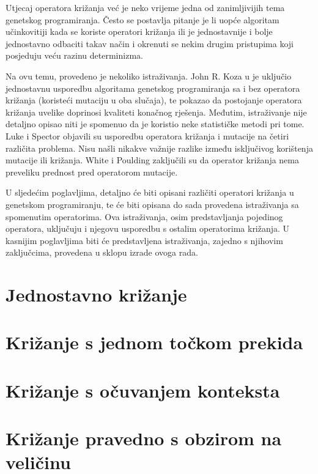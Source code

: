 Utjecaj operatora križanja već je neko vrijeme jedna od zanimljivijih tema genetskog programiranja. Često se postavlja pitanje je li uopće algoritam učinkovitiji kada se koriste operatori križanja ili je jednostavnije i bolje jednostavno odbaciti takav način i okrenuti se nekim drugim pristupima koji posjeduju veću razinu determinizma.

Na ovu temu, provedeno je nekoliko istraživanja. John R. Koza u \cite{koza} je uključio jednostavnu usporedbu algoritama genetskog programiranja sa i bez operatora križanja (koristeći mutaciju u oba slučaja), te pokazao da postojanje operatora križanja uvelike doprinosi kvaliteti konačnog rješenja. Međutim, istraživanje nije detaljno opisao niti je spomenuo da je koristio neke statističke metodi pri tome. Luke i Spector \cite{luke} objavili su usporedbu operatora križanja i mutacije na četiri različita problema. Nisu našli nikakve važnije razlike između isključivog korištenja mutacije ili križanja. White i Poulding \cite{rigo} zaključili su da operator križanja nema preveliku prednost pred operatorom mutacije. 

U sljedećim poglavljima, detaljno će biti opisani različiti operatori križanja u genetskom programiranju, te će biti opisana do sada provedena istraživanja sa spomenutim operatorima. Ova istraživanja, osim predstavljanja pojedinog operatora, uključuju i njegovu usporedbu s ostalim operatorima križanja. U kasnijim poglavljima biti će predstavljena istraživanja, zajedno s njihovim zaključcima, provedena u sklopu izrade ovoga rada.

\section{Jednostavno križanje}


\section{Križanje s jednom točkom prekida}


\section{Križanje s očuvanjem konteksta}


\section{Križanje pravedno s obzirom na veličinu}



